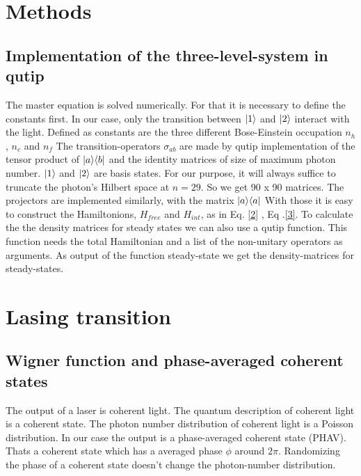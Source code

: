 \documentclass[12pt,a4paper]{article}
\DeclarePairedDelimiter\bra{\langle}{\rvert}
\DeclarePairedDelimiter\ket{\lvert}{\rangle}
\begin{document}
\section{Methods}

\subsection{Implementation of the three-level-system in qutip}
The master equation is solved numerically. For that it is necessary to define the constants first.
In our case, only the transition between $\ket{1}$ and $\ket{2}$ interact with the light. 
Defined as constants are the three different Bose-Einstein occupation $n_h$, $n_c$ and $n_f$
The transition-operators $\sigma_{ab}$ are  made by qutip \cite{Nation2022} implementation of the tensor product of $\ket{a}\bra{b}$ and the identity matrices of size of maximum photon number. 
$\ket{1}$ and $\ket{2}$ are basis states. For our purpose, it will  always suffice to truncate the photon's Hilbert space at $n=29$. So we get  90 x 90 matrices. 
The projectors are implemented similarly, with the matrix $\ket{a}\bra{a}$
With those it is easy to construct the Hamiltonions, $H_{free}$ and $H_{int}$, as in Eq. \eqref{2} , Eq .\eqref{3}.
To calculate the the density matrices for steady states we can also use a qutip function.
This function needs the total Hamiltonian and a list of the non-unitary operators as arguments.
As output of the function steady-state we get the density-matrices for steady-states. \cite{Nation2022}
\section{Lasing transition}

\subsection{Wigner function and phase-averaged coherent states}
The output of a laser is coherent light.
The quantum description of coherent light is a coherent state. The photon number distribution of coherent light is a Poisson distribution.
In our case the output is a phase-averaged coherent state (PHAV). 
Thats a coherent state which has a averaged phase $\phi$ around $2\pi$.
Randomizing the phase of a coherent state doesn't change the photon-number distribution. \\
\end{document}
